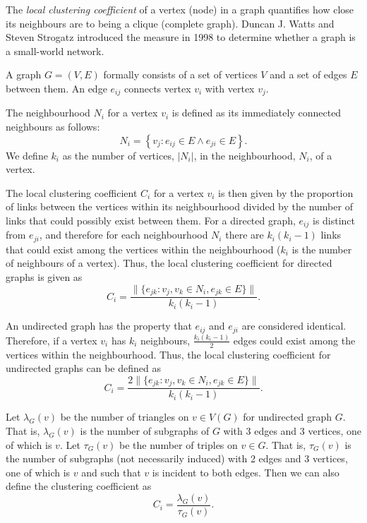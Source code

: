         The \emph{local clustering coefficient} of a vertex (node) in a graph quantifies how close its neighbours are to being a clique (complete graph). Duncan J. Watts and Steven Strogatz introduced the measure in 1998 to determine whether a graph is a small-world network.
              
        A graph $G=(V,E)$ formally consists of a set of vertices $V$ and a set of edges $E$ between them. An edge $e_{ij}$ connects vertex $v_i$ with vertex $v_j$.

        The neighbourhood $N_i$ for a vertex $v_i$ is defined as its immediately connected neighbours as follows:
        $$N_i = \left\{v_j: e_{ij} \in E \wedge e_{ji} \in E\right\} \mbox{.}$$
        We define $k_i$ as the number of vertices, $|N_i|$, in the neighbourhood, $N_i$, of a vertex.

        The local clustering coefficient $C_i$ for a vertex $v_i$ is then given by the proportion of links between the vertices within its neighbourhood divided by the number of links that could possibly exist between them. For a directed graph, $e_{ij}$ is distinct from $e_{ji}$, and therefore for each neighbourhood $N_i$ there are $k_i(k_i-1)$ links that could exist among the vertices within the neighbourhood ($k_i$ is the number of neighbours of a vertex). Thus, the local clustering coefficient for directed graphs is given as \cite{WattsStrogatz1998}
        $$C_i = \frac{\|\{e_{jk}: v_j,v_k \in N_i, e_{jk} \in E\}\|}{k_i(k_i-1)} \mbox{.}$$
              
        An undirected graph has the property that $e_{ij}$ and $e_{ji}$ are considered identical. Therefore, if a vertex $v_i$ has $k_i$ neighbours, $\frac{k_i(k_i-1)}{2}$ edges could exist among the vertices within the neighbourhood. Thus, the local clustering coefficient for undirected graphs can be defined as
        $$C_i = \frac{2\|\{e_{jk}: v_j,v_k \in N_i, e_{jk} \in E\}\|}{k_i(k_i-1)} \mbox{.}$$
    
        Let $\lambda_G(v)$ be the number of triangles on $v \in V(G)$ for undirected graph $G$. That is, $\lambda_G(v)$ is the number of subgraphs of $G$ with 3 edges and 3 vertices, one of which is $v$. Let $\tau_G(v)$ be the number of triples on $v \in G$. That is, $\tau_G(v)$ is the number of subgraphs (not necessarily induced) with 2 edges and 3 vertices, one of which is $v$ and such that $v$ is incident to both edges. Then we can also define the clustering coefficient as
        $$C_i = \frac{\lambda_G(v)}{\tau_G(v)} \mbox{.}$$

